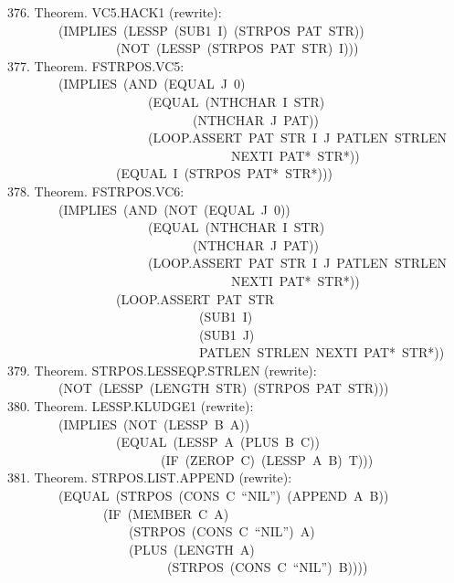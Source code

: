 \documentclass[10pt]{book}
\newenvironment{pubasis}{\begin{flushleft}}{\end{flushleft}}
\begin{document}
\begin{pubasis}
376.    Theorem.  VC5.HACK1 (rewrite):\\
~~~~~~~~(IMPLIES~(LESSP~(SUB1~I)~(STRPOS~PAT~STR))\\
~~~~~~~~~~~~~~~~~(NOT~(LESSP~(STRPOS~PAT~STR)~I)))\\

377.    Theorem.  FSTRPOS.VC5:\\
~~~~~~~~(IMPLIES~(AND~(EQUAL~J~0)\\
~~~~~~~~~~~~~~~~~~~~~~(EQUAL~(NTHCHAR~I~STR)\\
~~~~~~~~~~~~~~~~~~~~~~~~~~~~~(NTHCHAR~J~PAT))\\
~~~~~~~~~~~~~~~~~~~~~~(LOOP.ASSERT~PAT~STR~I~J~PATLEN~STRLEN\\
~~~~~~~~~~~~~~~~~~~~~~~~~~~~~~~~~~~NEXTI~PAT*~STR*))\\
~~~~~~~~~~~~~~~~~(EQUAL~I~(STRPOS~PAT*~STR*)))\\

378.    Theorem.  FSTRPOS.VC6:\\
~~~~~~~~(IMPLIES~(AND~(NOT~(EQUAL~J~0))\\
~~~~~~~~~~~~~~~~~~~~~~(EQUAL~(NTHCHAR~I~STR)\\
~~~~~~~~~~~~~~~~~~~~~~~~~~~~~(NTHCHAR~J~PAT))\\
~~~~~~~~~~~~~~~~~~~~~~(LOOP.ASSERT~PAT~STR~I~J~PATLEN~STRLEN\\
~~~~~~~~~~~~~~~~~~~~~~~~~~~~~~~~~~~NEXTI~PAT*~STR*))\\
~~~~~~~~~~~~~~~~~(LOOP.ASSERT~PAT~STR\\
~~~~~~~~~~~~~~~~~~~~~~~~~~~~~~(SUB1~I)\\
~~~~~~~~~~~~~~~~~~~~~~~~~~~~~~(SUB1~J)\\
~~~~~~~~~~~~~~~~~~~~~~~~~~~~~~PATLEN~STRLEN~NEXTI~PAT*~STR*))\\

379.    Theorem.  STRPOS.LESSEQP.STRLEN (rewrite):\\
~~~~~~~~(NOT~(LESSP~(LENGTH~STR)~(STRPOS~PAT~STR)))\\

380.    Theorem.  LESSP.KLUDGE1 (rewrite):\\
~~~~~~~~(IMPLIES~(NOT~(LESSP~B~A))\\
~~~~~~~~~~~~~~~~~(EQUAL~(LESSP~A~(PLUS~B~C))\\
~~~~~~~~~~~~~~~~~~~~~~~~(IF~(ZEROP~C)~(LESSP~A~B)~T)))\\

381.    Theorem.  STRPOS.LIST.APPEND (rewrite):\\
~~~~~~~~(EQUAL~(STRPOS~(CONS~C~``NIL'')~(APPEND~A~B))\\
~~~~~~~~~~~~~~~(IF~(MEMBER~C~A)\\
~~~~~~~~~~~~~~~~~~~(STRPOS~(CONS~C~``NIL'')~A)\\
~~~~~~~~~~~~~~~~~~~(PLUS~(LENGTH~A)\\
~~~~~~~~~~~~~~~~~~~~~~~~~(STRPOS~(CONS~C~``NIL'')~B))))\\


\end{pubasis}
\end{document}
